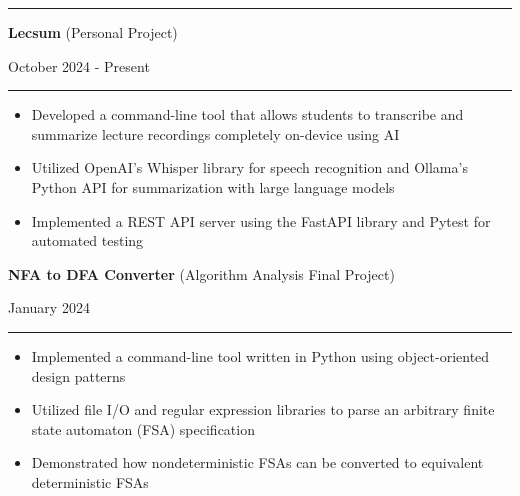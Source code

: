 \documentclass[letter]{article}
\begin{document}
    \medskip
    \vspace{4pt}
    \hrule height 1pt
    \vspace{4pt}

    \noindent
    \begin{minipage}[c]{0.8\linewidth}
        \noindent \textbf{Lecsum} (Personal Project)
    \end{minipage}
    \begin{minipage}[c]{0.19\linewidth}
        \begin{flushright}
            October 2024 - Present
        \end{flushright}
    \end{minipage}
    \vspace{4pt}
    \hrule
    \vspace{4pt}
    \noindent
    \begin{itemize}[noitemsep, topsep=0pt]
        \item Developed a command-line tool that allows students to transcribe and summarize lecture recordings completely on-device using AI
        \item Utilized OpenAI's Whisper library for speech recognition and Ollama's Python API for summarization with large language models
        \item Implemented a REST API server using the FastAPI library and Pytest for automated testing
    \end{itemize}
    \medskip

    \noindent
    \begin{minipage}[c]{0.8\linewidth}
        \noindent \textbf{NFA to DFA Converter} (Algorithm Analysis Final Project)
    \end{minipage}
    \begin{minipage}[c]{0.19\linewidth}
        \begin{flushright}
            January 2024
        \end{flushright}
    \end{minipage}
    \vspace{4pt}
    \hrule
    \vspace{4pt}
    \noindent
    \begin{itemize}[noitemsep, topsep=0pt]
        \item Implemented a command-line tool written in Python using object-oriented design patterns
        \item Utilized file I/O and regular expression libraries to parse an arbitrary finite state automaton (FSA) specification
        \item Demonstrated how nondeterministic FSAs can be converted to equivalent deterministic FSAs
    \end{itemize}
    \medskip
\end{document}
